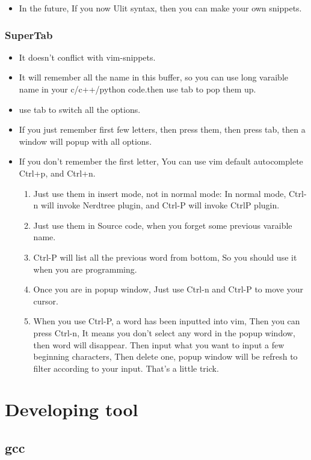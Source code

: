 \documentclass[a4paper,12pt,twoside]{book}
\begin{document}
\begin{itemize}
\begin{itemize}
\item In the future, If you now Ulit syntax, then you can make your own snippets. 

\end{itemize}

\subsection{SuperTab}
\begin{itemize}
		\item It doesn't conflict with vim-snippets. 
		\item It will remember all the name in this buffer, so you can use long varaible name in your c/c++/python code.then use tab to pop them up. 
		\item use tab to switch all the options. 
		\item If you just remember first few letters, then press them, then press tab, then a window will popup with all options.
		\item If you don't remember the first letter, You can use vim default autocomplete Ctrl+p, and Ctrl+n. 
				\begin{enumerate}
						\item Just use them in insert mode, not in normal mode: In normal mode, Ctrl-n will invoke Nerdtree plugin, and Ctrl-P will invoke CtrlP plugin.
						\item Just use them in Source code, when you forget some previous varaible name.
						\item Ctrl-P will list all the previous word from bottom, So you should use it when you are programming.
						\item Once you are in popup window, Just use Ctrl-n and Ctrl-P to move your cursor. 
						\item When you use Ctrl-P, a word has been inputted into vim, Then you can press Ctrl-n, It means you don't select any word in the popup window, then word will disappear. Then input what you want to input a few beginning characters, Then delete one, popup window will be refresh to filter according to your input. That's a little trick.
				\end{enumerate}
\end{itemize}


\chapter{Developing tool}
\section{gcc}

\end{itemize}
\end{document}

